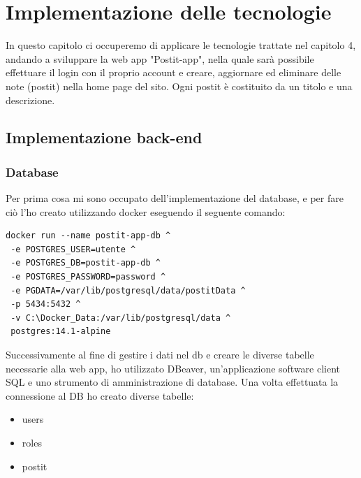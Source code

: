 \chapter{Implementazione delle tecnologie}\label{capitolo-4}
In questo capitolo ci occuperemo di applicare le tecnologie trattate nel capitolo 4, andando a sviluppare la web app "Postit-app", nella quale sarà possibile effettuare il login con il proprio account e creare, aggiornare ed eliminare delle note (postit) nella home page del sito. Ogni postit è costituito da un titolo e una descrizione.

\section{Implementazione back-end}


\subsection{Database}
Per prima cosa mi sono occupato dell'implementazione del database, e per fare ciò l'ho creato utilizzando docker eseguendo il seguente comando:
\\
\begin{lstlisting}[language=xml,basicstyle=\small, caption={Creazione del DB "postit-app-db"}, captionpos=b]
docker run --name postit-app-db ^
 -e POSTGRES_USER=utente ^
 -e POSTGRES_DB=postit-app-db ^
 -e POSTGRES_PASSWORD=password ^
 -e PGDATA=/var/lib/postgresql/data/postitData ^
 -p 5434:5432 ^
 -v C:\Docker_Data:/var/lib/postgresql/data ^
 postgres:14.1-alpine
\end{lstlisting}

Successivamente al fine di gestire i dati nel db e creare le diverse tabelle necessarie alla web app, ho utilizzato DBeaver, un'applicazione software client SQL e uno strumento di amministrazione di database.
Una volta effettuata la connessione al DB ho creato diverse tabelle:
\begin{itemize}
    \item users
    \item roles
    \item postit
\end{itemize}
\newpage

